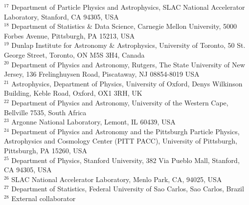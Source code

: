 \documentclass[\docopts]{\docclass}
\begin{document}
$^{17}$ Department of Particle Physics and Astrophysics, SLAC National Accelerator Laboratory, Stanford, CA 94305, USA\\
$^{18}$ Department of Statistics \& Data Science, Carnegie Mellon University, 5000 Forbes Avenue, Pittsburgh, PA 15213, USA\\
$^{19}$ Dunlap Institute for Astronomy \& Astrophysics, University of Toronto, 50 St. George Street, Toronto, ON M5S 3H4, Canada\\
$^{20}$ Department of Physics and Astronomy, Rutgers, The State University of New Jersey, 136 Frelinghuysen Road, Piscataway, NJ 08854-8019 USA\\
$^{21}$ Astrophysics, Department of Physics, University of Oxford, Denys Wilkinson Building, Keble Road, Oxford, OX1 3RH, UK\\
$^{22}$ Department of Physics and Astronomy, University of the Western Cape, Bellville 7535, South Africa\\
$^{23}$ Argonne National Laboratory, Lemont, IL 60439, USA\\
$^{24}$ Department of Physics and Astronomy and the Pittsburgh Particle Physics, Astrophysics and Cosmology Center (PITT PACC), University of Pittsburgh, Pittsburgh, PA 15260, USA\\
$^{25}$ Department of Physics, Stanford University, 382 Via Pueblo Mall, Stanford, CA 94305, USA\\
$^{26}$ SLAC National Accelerator Laboratory, Menlo Park, CA, 94025, USA\\
$^{27}$ Department of Statistics, Federal University of Sao Carlos, Sao Carlos, Brazil\\
$^{28}$ External collaborator\\
\end{document}
